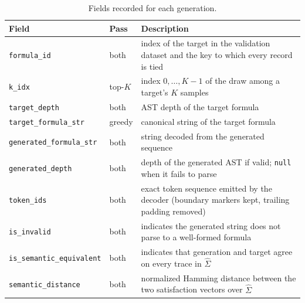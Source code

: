 \documentclass[titlepage,a4paper,11pt]{report}
\begin{document}
    \begin{table}[ht]
        \centering
        \caption{Fields recorded for each generation.}
        \label{tab:validation_record_schema}
        \begin{tabular}{l l p{7.4cm}}
            \toprule
            Field & Pass & Description \\
            \midrule
            \texttt{formula\_id}                & both    & index of the target in the validation dataset and the key to which every record is tied \\
            \texttt{k\_idx}                     & top-$K$ & index $0,\dots,K{-}1$ of the draw among a target's $K$ samples \\
            \texttt{target\_depth}              & both    & AST depth of the target formula \\
            \texttt{target\_formula\_str}       & greedy  & canonical string of the target formula \\
            \texttt{generated\_formula\_str}    & both    & string decoded from the generated sequence \\
            \texttt{generated\_depth}           & both    & depth of the generated AST if valid; \texttt{null} when it fails to parse \\
            \texttt{token\_ids}                 & both    & exact token sequence emitted by the decoder (boundary markers kept, trailing padding removed) \\
            \texttt{is\_invalid}                & both    & indicates the generated string does not parse to a well-formed formula \\
            \texttt{is\_semantic\_equivalent}   & both    & indicates that generation and target agree on every trace in $\widehat\Sigma$ \\
            \texttt{semantic\_distance}         & both    & normalized Hamming distance between the two satisfaction vectors over $\widehat\Sigma$ \\
            \bottomrule
        \end{tabular}
    \end{table}
\end{document}
